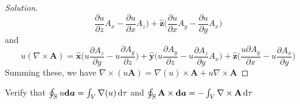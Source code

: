 \begin{proof}[Solution]
\begin{equation*}
                        \frac{\partial u}{\partial z}A_{x}
                        -\frac{\partial u}{\partial x}A_{z}
                    \big)
                    +\hat{\mathbf{z}}\big(
                        \frac{\partial u}{\partial x}A_{y}
                        -\frac{\partial u}{\partial y}A_{x}
                    \big)
                \end{equation*}
                and
                \begin{equation*}
                    u(\nabla\times\mathbf{A})
                    =\hat{\mathbf{x}}\big(
                        u\frac{\partial{A_{z}}}{\partial{y}}
                        -u\frac{\partial{A_{y}}}{\partial{z}}
                    \big)
                    +\hat{\mathbf{y}}\big(
                        u\frac{\partial{A_{y}}}{\partial{z}}
                        -u\frac{\partial{A_{z}}}{\partial{y}}A_{x}
                    \big)
                    +\hat{\mathbf{z}}\big(
                        \frac{u\partial{A_{y}}}{\partial{x}}
                        -u\frac{\partial{A_{x}}}{\partial{y}}
                    \big)
                \end{equation*}
                Summing these, we have
                $\nabla\times(u\mathbf{A})%
                 =\nabla(u)\times\mathbf{A}%
                 +u\nabla\times\mathbf{A}$
            \end{proof}
            \begin{problem}[Wangsness 1-26]
                Verify that
                $\oint_{S}u\boldsymbol{\diff{a}}%
                 =\int_{V}\nabla(u)\diff{\tau}$
                and
                $\oint_{S}\mathbf{A}\times\boldsymbol{\diff{a}}%
                 =-\int_{V}\nabla\times\mathbf{A}\diff{\tau}$
            \end{problem}
